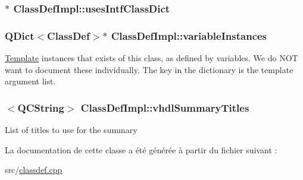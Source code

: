 \subsubsection[{uses\+Intf\+Class\+Dict}]{$\ast$ Class\+Def\+Impl\+::uses\+Intf\+Class\+Dict}\label{class_class_def_impl_ab7e80405e26e2e111e5869c016cc9783}
\hypertarget{class_class_def_impl_ac515e81dfa0ea2fe1e7aabe14d65d488}{}
\subsubsection[{variable\+Instances}]{\setlength{\rightskip}{0pt plus 5cm}Q\+Dict$<${\bf Class\+Def}$>$$\ast$ Class\+Def\+Impl\+::variable\+Instances}\label{class_class_def_impl_ac515e81dfa0ea2fe1e7aabe14d65d488}
\hyperlink{class_template}{Template} instances that exists of this class, as defined by variables. We do N\+O\+T want to document these individually. The key in the dictionary is the template argument list. \hypertarget{class_class_def_impl_a1ab8fae1f7661cf9461678debaf0c5f7}{}
\subsubsection[{vhdl\+Summary\+Titles}]{$<${\bf Q\+C\+String}$>$ Class\+Def\+Impl\+::vhdl\+Summary\+Titles}\label{class_class_def_impl_a1ab8fae1f7661cf9461678debaf0c5f7}
List of titles to use for the summary 

La documentation de cette classe a été générée à partir du fichier suivant \+:\begin{DoxyCompactItemize}
\item 
src/\hyperlink{classdef_8cpp}{classdef.\+cpp}\end{DoxyCompactItemize}
